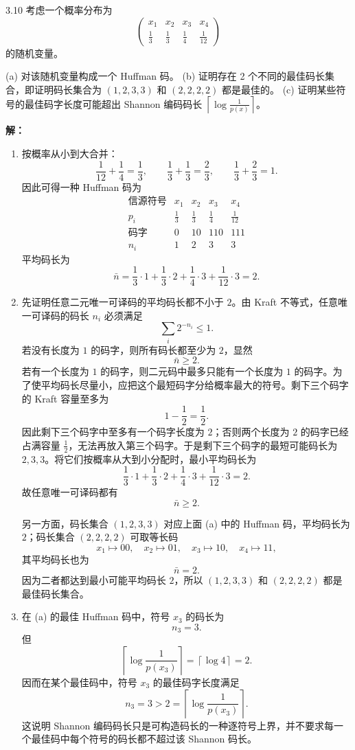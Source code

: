 \documentclass[UTF8,11pt,a4paper]{ctexart}
\begin{document}
\begin{problem}{3.10}
考虑一个概率分布为
\[
\begin{pmatrix}
x_1 & x_2 & x_3 & x_4 \\
\frac{1}{3} & \frac{1}{3} & \frac{1}{4} & \frac{1}{12}
\end{pmatrix}
\]
的随机变量。

(a) 对该随机变量构成一个 Huffman 码。
(b) 证明存在 2 个不同的最佳码长集合，即证明码长集合为 $(1,2,3,3)$ 和 $(2,2,2,2)$ 都是最佳的。
(c) 证明某些符号的最佳码字长度可能超出 Shannon 编码码长 $\left\lceil \log \frac{1}{p(x)} \right\rceil$。
\end{problem}
\noindent\textbf{解：}
\begin{enumerate}[label=\textnormal{(\alph*)}]
  \item 按概率从小到大合并：
  \[
  \frac{1}{12}+\frac{1}{4}=\frac{1}{3},\qquad
  \frac{1}{3}+\frac{1}{3}=\frac{2}{3},\qquad
  \frac{1}{3}+\frac{2}{3}=1.
  \]
  因此可得一种 Huffman 码为
  \[
  \begin{array}{c|cccc}
  \text{信源符号} & x_1 & x_2 & x_3 & x_4\\ \hline
  p_i & \frac13 & \frac13 & \frac14 & \frac1{12}\\
  \text{码字} & 0 & 10 & 110 & 111\\
  n_i & 1 & 2 & 3 & 3
  \end{array}
  \]
  平均码长为
  \[
  \bar n
  =\frac13\cdot 1+\frac13\cdot 2+\frac14\cdot 3+\frac1{12}\cdot 3
  =2.
  \]

  \item 先证明任意二元唯一可译码的平均码长都不小于 $2$。由 Kraft 不等式，任意唯一可译码的码长 $n_i$ 必须满足
  \[
  \sum_i2^{-n_i}\le 1.
  \]
  若没有长度为 $1$ 的码字，则所有码长都至少为 $2$，显然
  \[
  \bar n\ge 2.
  \]
  若有一个长度为 $1$ 的码字，则二元码中最多只能有一个长度为 $1$ 的码字。为了使平均码长尽量小，应把这个最短码字分给概率最大的符号。剩下三个码字的 Kraft 容量至多为
  \[
  1-\frac12=\frac12.
  \]
  因此剩下三个码字中至多有一个码字长度为 $2$；否则两个长度为 $2$ 的码字已经占满容量 $\frac12$，无法再放入第三个码字。于是剩下三个码字的最短可能码长为 $2,3,3$。将它们按概率从大到小分配时，最小平均码长为
  \[
  \frac13\cdot 1+\frac13\cdot 2+\frac14\cdot 3+\frac1{12}\cdot 3=2.
  \]
  故任意唯一可译码都有
  \[
  \bar n\ge 2.
  \]

  另一方面，码长集合 $(1,2,3,3)$ 对应上面 (a) 中的 Huffman 码，平均码长为 $2$；码长集合 $(2,2,2,2)$ 可取等长码
  \[
  x_1\mapsto 00,\quad x_2\mapsto 01,\quad x_3\mapsto 10,\quad x_4\mapsto 11,
  \]
  其平均码长也为
  \[
  \bar n=2.
  \]
  因为二者都达到最小可能平均码长 $2$，所以 $(1,2,3,3)$ 和 $(2,2,2,2)$ 都是最佳码长集合。

  \item 在 (a) 的最佳 Huffman 码中，符号 $x_3$ 的码长为
  \[
  n_3=3.
  \]
  但
  \[
  \left\lceil \log\frac1{p(x_3)}\right\rceil
  =
  \left\lceil \log 4\right\rceil
  =2.
  \]
  因而在某个最佳码中，符号 $x_3$ 的最佳码字长度满足
  \[
  n_3=3>2=\left\lceil \log\frac1{p(x_3)}\right\rceil.
  \]
  这说明 Shannon 编码码长只是可构造码长的一种逐符号上界，并不要求每一个最佳码中每个符号的码长都不超过该 Shannon 码长。
\end{enumerate}
\end{document}
